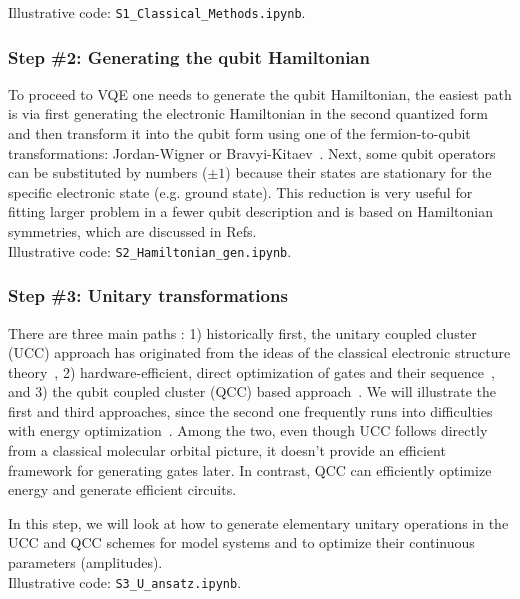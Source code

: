 \documentclass[12pt]{article}
\begin{document}
Illustrative code: \texttt{S1\_Classical\_Methods.ipynb}.

\subsubsection*{Step \#2: Generating the qubit Hamiltonian}

To proceed to VQE one needs to generate the qubit Hamiltonian, the easiest path is via first 
generating the electronic Hamiltonian in the second quantized form and then transform it into the qubit form using one of 
the fermion-to-qubit transformations: Jordan-Wigner or Bravyi-Kitaev~\cite{Seeley:2012/jcp/224109}. 
Next, some qubit operators can be substituted by numbers ($\pm 1$)
because their states are stationary for the specific electronic state (e.g. ground state). This reduction is very useful for fitting larger problem in 
a fewer qubit description and is based on Hamiltonian symmetries, which are discussed in Refs.~\cite{Bravyi:2017wba,Yen:2019bs,Setia:2019uz} \\

Illustrative code: \texttt{S2\_Hamiltonian\_gen.ipynb}.

\subsubsection*{Step \#3: Unitary transformations}

There are three main paths : 1) historically first, the unitary coupled cluster (UCC) approach has originated from the ideas of the classical 
electronic structure theory~\cite{Romero2018,Hempel2018}, 
2) hardware-efficient, direct optimization of gates and their sequence~\cite{Kandala:2017/nature/242}, 
and 3)  the qubit coupled cluster (QCC) based approach~\cite{Ryabinkin2018}. 
We will illustrate the first and third approaches, since the second one frequently runs into difficulties with energy optimization~\cite{McClean2018}. 
Among the two, even though UCC follows directly from a classical molecular orbital picture, it doesn't provide an efficient framework 
for generating gates later. In contrast, QCC can efficiently optimize energy and generate efficient circuits.

In this step, we will look at how to generate elementary unitary operations in the UCC and QCC schemes for model 
systems and to optimize their continuous parameters (amplitudes). \\ 

Illustrative code: \texttt{S3\_U\_ansatz.ipynb}.
\end{document}
